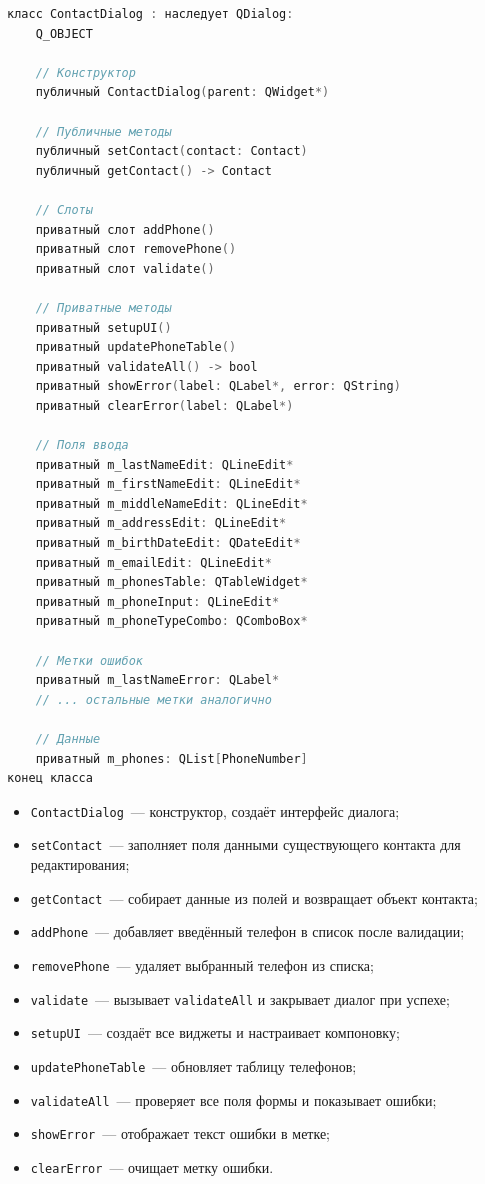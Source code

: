 \begin{lstlisting}[language=C, caption=Заголовочный файл createcontact.h]
класс ContactDialog : наследует QDialog:
    Q_OBJECT
    
    // Конструктор
    публичный ContactDialog(parent: QWidget*)

    // Публичные методы
    публичный setContact(contact: Contact)
    публичный getContact() -> Contact

    // Слоты
    приватный слот addPhone()
    приватный слот removePhone()
    приватный слот validate()

    // Приватные методы
    приватный setupUI()
    приватный updatePhoneTable()
    приватный validateAll() -> bool
    приватный showError(label: QLabel*, error: QString)
    приватный clearError(label: QLabel*)

    // Поля ввода
    приватный m_lastNameEdit: QLineEdit*
    приватный m_firstNameEdit: QLineEdit*
    приватный m_middleNameEdit: QLineEdit*
    приватный m_addressEdit: QLineEdit*
    приватный m_birthDateEdit: QDateEdit*
    приватный m_emailEdit: QLineEdit*
    приватный m_phonesTable: QTableWidget*
    приватный m_phoneInput: QLineEdit*
    приватный m_phoneTypeCombo: QComboBox*
    
    // Метки ошибок
    приватный m_lastNameError: QLabel*
    // ... остальные метки аналогично
    
    // Данные
    приватный m_phones: QList[PhoneNumber]
конец класса
\end{lstlisting}

\begin{itemize}
    \item \texttt{ContactDialog}~--- конструктор, создаёт интерфейс диалога;
    \item \texttt{setContact}~--- заполняет поля данными существующего контакта для редактирования;
    \item \texttt{getContact}~--- собирает данные из полей и возвращает объект контакта;
    \item \texttt{addPhone}~--- добавляет введённый телефон в список после валидации;
    \item \texttt{removePhone}~--- удаляет выбранный телефон из списка;
    \item \texttt{validate}~--- вызывает \texttt{validateAll} и закрывает диалог при успехе;
    \item \texttt{setupUI}~--- создаёт все виджеты и настраивает компоновку;
    \item \texttt{updatePhoneTable}~--- обновляет таблицу телефонов;
    \item \texttt{validateAll}~--- проверяет все поля формы и показывает ошибки;
    \item \texttt{showError}~--- отображает текст ошибки в метке;
    \item \texttt{clearError}~--- очищает метку ошибки.
\end{itemize}

